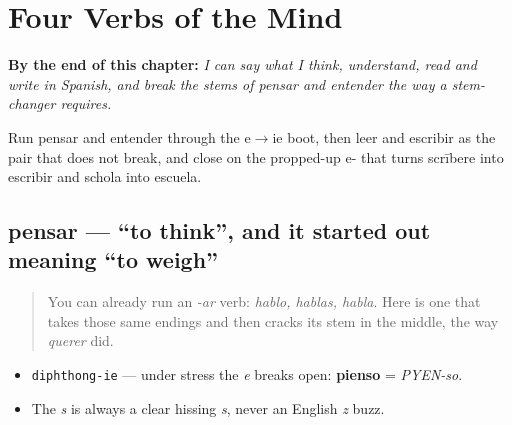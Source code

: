 
\chapter{Four Verbs of the Mind}
\label{ch:spanish-verbs-of-the-mind}

\begin{chapteropening}
\textbf{By the end of this chapter:} \emph{I can say what I think, understand, read and write in Spanish, and break the stems of pensar and entender the way a stem-changer requires.}

Run pensar and entender through the e$\to$ie boot, then leer and escribir as the pair that does not break, and close on the propped-up e- that turns scrībere into escribir and schola into escuela.
\end{chapteropening}

\section[pensar]{pensar — \textquotedblleft{}to think\textquotedblright{}, and it started out meaning \textquotedblleft{}to weigh\textquotedblright{}}

\label{lesson:ES-C34-pensar}



\begin{quote}
You can already run an \emph{-ar} verb: \emph{hablo, hablas, habla}. Here is one that takes those same endings and then cracks its stem in the middle, the way \emph{querer} did.
\end{quote}

\begin{sounds}
\begin{itemize}
\raggedright
  \item \texttt{diphthong-ie} — under stress the \emph{e} breaks open: \textbf{pienso} = \emph{PYEN-so}.
  \item The \emph{s} is always a clear hissing \emph{s}, never an English \emph{z} buzz.
\end{itemize}
\end{sounds}

